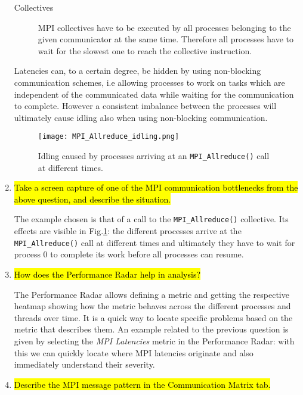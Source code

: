 \documentclass{article}
\begin{document}
\begin{enumerate}
\begin{description}
		\item[Collectives] MPI collectives have to be executed by all processes belonging to the given communicator at the same time. Therefore all processes have to wait for the slowest one to reach the collective instruction.
	\end{description}

	Latencies can, to a certain degree, be hidden by using non-blocking communication schemes, i.e allowing processes to work on tasks which are independent of the communicated data while waiting for the communication to complete. However a consistent imbalance between the processes will ultimately cause idling also when using non-blocking communication.

	\begin{figure}[p] %
		\begin{center}
			\texttt{[image: MPI\_Allreduce\_idling.png]}
		\cprotect\caption{Idling caused by processes arriving at an \verb!MPI_Allreduce()! call at different times.}
		\label{fig:MPI_Allreduce_latency}
		\end{center}
	\end{figure}

	\item \hl{Take a screen capture of one of the MPI communication bottlenecks from the above question, and describe the situation.} ~

	The example chosen is that of a call to the \verb!MPI_Allreduce()! collective. Its effects are visible in Fig.\ref{fig:MPI_Allreduce_latency}: the different processes arrive at the \verb!MPI_Allreduce()! call at different times and ultimately they have to wait for process 0 to complete its work before all processes can resume.

	\item \hl{How does the Performance Radar help in analysis?} ~

	The Performance Radar allows defining a metric and getting the respective heatmap showing how the metric behaves across the different processes and threads over time. It is a quick way to locate specific problems based on the metric that describes them.
	An example related to the previous question is given by selecting the \emph{MPI Latencies} metric in the Performance Radar: with this we can quickly locate where MPI latencies originate and also immediately understand their severity.

	\item \hl{Describe the MPI message pattern in the Communication Matrix tab.} ~


\end{enumerate}
\end{document}
